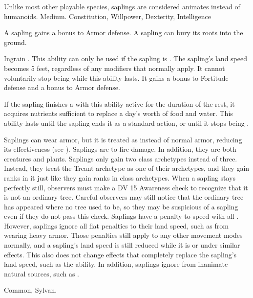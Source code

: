    Unlike most other playable species, saplings are considered animates instead of humanoids.
   Medium.
    Constitution,  Willpower,  Dexterity,  Intelligence
  \begin{itemize}
     A sapling gains a  bonus to Armor defense.
     A sapling can bury its roots into the ground.
      \begin{activeability}{Ingrain}
        \abilityusagetime {}.
        \rankline
        This ability can only be used if the sapling is .
        The sapling's land speed becomes 5 feet, regardless of any modifiers that normally apply.
        It cannot voluntarily stop being  while this ability lasts.
        It gains a  bonus to Fortitude defense and a  bonus to Armor defense.

        If the sapling finishes a  with this ability active for the duration of the rest, it acquires nutrients sufficient to replace a day's worth of food and water.
        This ability lasts until the sapling ends it as a standard action, or until it stops being .
      \end{activeability}
     Saplings can wear armor, but it is treated as  instead of normal armor, reducing its effectiveness (see ).
     Saplings are \vulnerable to fire damage. In addition, they are both creatures and plants.
     Saplings only gain two class archetypes instead of three.
      Instead, they treat the Treant archetype as one of their archetypes, and they gain ranks in it just like they gain ranks in class archetypes.
     When a sapling stays perfectly still, observers must make a DV 15 Awareness check to recognize that it is not an ordinary tree.
      Careful observers may still notice that the ordinary tree has appeared where no tree used to be, so they may be suspicious of a sapling even if they do not pass this check.
     Saplings have a  penalty to speed with all .
      However, saplings ignore all flat penalties to their land speed, such as from wearing heavy armor.
      Those penalties still apply to any other movement modes normally, and a sapling's land speed is still reduced while it is \slowed or under similar effects.
      This also does not change effects that completely replace the sapling's land speed, such as the  ability.
      In addition, saplings ignore  from inanimate natural sources, such as .
  \end{itemize}
   Common, Sylvan.

